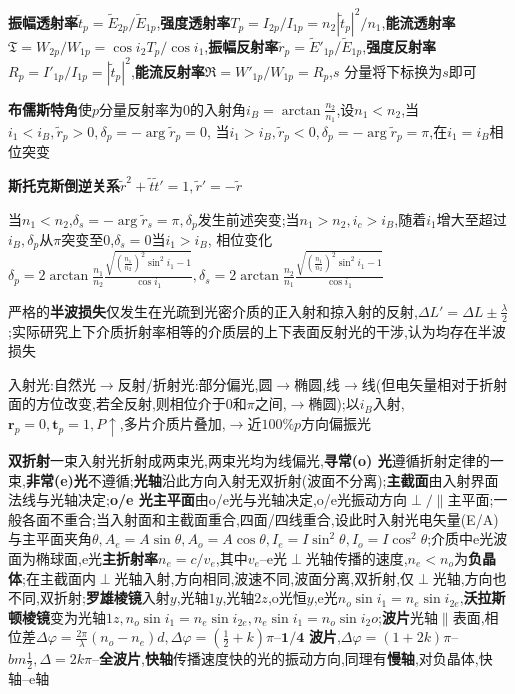\documentclass[10pt,a4paper]{article}
\begin{document}
\textbf{振幅透射率}$\widetilde{t}_p=\widetilde{E}_{2p}/\widetilde{E}_{1p}$,\textbf{强度透射率}$T_p=I_{2p}/I_{1p}=n_2|\widetilde{t}_p|^2/n_1$,\textbf{能流透射率}$\mathfrak{T}=W_{2p}/W_{1p}=\cos i_2T_p/\cos i_1$,\textbf{振幅反射率}$\widetilde{r}_p=\widetilde{E}'_{1p}/\widetilde{E}_{1p}$,\textbf{强度反射率}$R_p=I'_{1p}/I_{1p}=|\widetilde{t}_p|^2$,\textbf{能流反射率}$\mathfrak{R}=W'_{1p}/W_{1p}=R_p$,$s$ 分量将下标换为$s$即可

\textbf{布儒斯特角}使$p$分量反射率为$0$的入射角$i_B=\arctan\frac{n_2}{n_1}$,设$n_1<n_2$,当$i_1<i_B,\widetilde{r}_p>0,\delta_p=-\arg\widetilde{r}_p=0$, 当$i_1>i_B,\widetilde{r}_p<0,\delta_p=-\arg\widetilde{r}_p=\pi$,在$i_1=i_B$相位突变

\textbf{斯托克斯倒逆关系}$\widetilde{r}^2+\widetilde{t}\widetilde{t}'=1,\widetilde{r}'=-\widetilde{r}$

当$n_1<n_2$,$\delta_s=-\arg\widetilde{r}_s=\pi,\delta_p$发生前述突变;当$n_1>n_2,i_c>i_B$,随着$i_1$增大至超过$i_B,\delta_p$从$\pi$突变至$0$,$\delta_s=0$当$i_1>i_B$, 相位变化\\
$\delta_p=2\arctan\frac{n_1}{n_2}\frac{\sqrt{(\frac{n_1}{n_2})^2\sin^2i_1-1}}{\cos i_1},\delta_s=2\arctan\frac{n_2}{n_1}\frac{\sqrt{(\frac{n_1}{n_2})^2\sin^2i_1-1}}{\cos i_1}$

严格的\textbf{半波损失}仅发生在光疏到光密介质的正入射和掠入射的反射,$\Delta L'=\Delta L\pm\frac{\lambda}{2}$;实际研究上下介质折射率相等的介质层的上下表面反射光的干涉,认为均存在半波损失

入射光:自然光$\to$反射/折射光:部分偏光,圆$\to$椭圆,线$\to$线(但电矢量相对于折射面的方位改变,若全反射,则相位介于$0$和$\pi$之间,$\to$椭圆);以$i_B$入射,$\textbf{r}_p=0,\textbf{t}_p=1,P\uparrow$,多片介质片叠加,$\to$近$100\%p$方向偏振光

\textbf{双折射}一束入射光折射成两束光,两束光均为线偏光,\textbf{寻常(o) 光}遵循折射定律的一束,\textbf{非常(e)光}不遵循;\textbf{光轴}沿此方向入射无双折射(波面不分离);\textbf{主截面}由入射界面法线与光轴决定;\textbf{o/e 光主平面}由o/e光与光轴决定,o/e光振动方向$\perp/\parallel$主平面;一般各面不重合;当入射面和主截面重合,四面/四线重合,设此时入射光电矢量(E/A) 与主平面夹角$\theta,A_e=A\sin\theta,A_o=A\cos\theta,I_e=I\sin^2\theta,I_o=I\cos^2\theta$;介质中e光波面为椭球面,e光\textbf{主折射率}$n_e=c/v_e$,其中$v_e$--e光$\perp$光轴传播的速度,$n_e<n_o$为\textbf{负晶体};在主截面内$\perp$光轴入射,方向相同,波速不同,波面分离,双折射,仅$\perp$光轴,方向也不同,双折射;\textbf{罗雄棱镜}入射$y$,光轴$1y$,光轴$2z$,o光恒$y$,e光$n_o\sin i_1=n_e\sin i_{2e}$,\textbf{沃拉斯顿棱镜}变为光轴$1z,n_o\sin i_1=n_e\sin i_{2e},n_e\sin i_1=n_o\sin i_2o$;\textbf{波片}光轴$\parallel$表面,相位差$\Delta\varphi=\frac{2\pi}{\lambda}(n_o-n_e)d,\Delta\varphi=(\frac{1}{2}+k)\pi$--$\bm{1/4}$ \textbf{波片},$\Delta\varphi=(1+2k)\pi$--$bm{\frac{1}{2}},\Delta=2k\pi$--\textbf{全波片},\textbf{快轴}传播速度快的光的振动方向,同理有\textbf{慢轴},对负晶体,快轴--e轴
\end{document}
